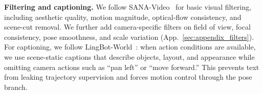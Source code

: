 \noindent\textbf{Filtering and captioning.}
We follow SANA-Video~\citep{chen2025sana} for basic visual filtering, including aesthetic quality, motion magnitude, optical-flow consistency, and scene-cut removal.
We further add camera-specific filters on field of view, focal consistency, pose smoothness, and scale variation (App.~\ref{sec:appendix_filters}).
For captioning, we follow LingBot-World~\citep{lingbot_world}: when action conditions are available, we use scene-static captions that describe objects, layout, and appearance while omitting camera actions such as ``pan left'' or ``move forward.''
This prevents text from leaking trajectory supervision and forces motion control through the pose branch.

